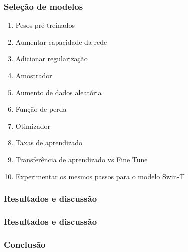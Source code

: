 \documentclass{beamer}
\begin{document}
\begin{frame}
\frametitle{Seleção de modelos}
\begin{enumerate}
    \item Pesos pré-treinados
    \item Aumentar capacidade da rede
    \item Adicionar regularização 
    \item Amostrador
    \item Aumento de dados aleatória
    \item Função de perda
    \item Otimizador
    \item Taxas de aprendizado
    \item Transferência de aprendizado vs Fine Tune
    \item Experimentar os mesmos passos para o modelo Swin-T
\end{enumerate}
\end{frame}



\begin{frame}
\frametitle{Resultados e discussão}

\end{frame}



\begin{frame}
\frametitle{Resultados e discussão}

\end{frame}        

\begin{frame}
\frametitle{Conclusão}



\end{frame}




\end{document}
